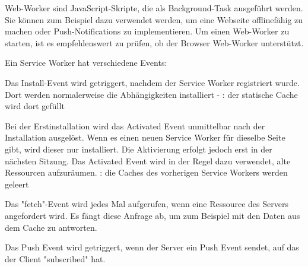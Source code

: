 

Web-Worker sind JavaScript-Skripte, die als Background-Task ausgeführt werden. Sie können zum Beispiel dazu verwendet werden, um eine Webseite offlinefähig zu machen oder Push-Notifications zu implementieren. Um einen Web-Worker zu starten, ist es empfehlenswert zu prüfen, ob der Browser Web-Worker unterstützt.


Ein Service Worker hat verschiedene Events: 


Das Install-Event wird getriggert, nachdem der Service Worker registriert wurde. Dort werden normalerweise die Abhängigkeiten installiert - \zb: der statische Cache wird dort gefüllt 


Bei der Erstinstallation wird das Activated Event unmittelbar nach der Installation ausgelöst. Wenn es einen neuen Service Worker für dieselbe Seite gibt, wird dieser nur installiert. Die Aktivierung erfolgt jedoch erst in der nächsten Sitzung. Das Activated Event wird in der Regel dazu verwendet, alte Ressourcen aufzuräumen. \zb: die Caches des vorherigen Service Workers werden geleert


Das "fetch"-Event wird jedes Mal aufgerufen, wenn eine Ressource des Servers angefordert wird. Es fängt diese Anfrage ab, um zum Beispiel mit den Daten aus dem Cache zu antworten.


Das Push Event wird getriggert, wenn der Server ein Push Event sendet, auf das der Client "subscribed" hat.

